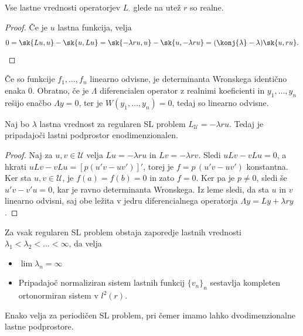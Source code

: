 
\begin{trditev}
  Vse lastne vrednosti operatorjev $L_\cdot$ glede na utež $r$ so realne.
\end{trditev}

\begin{proof}
  Če je $u$ lastna funkcija, velja
  \[
	0 = \sk{Lu, u} - \sk{u, Lu}
	= \sk{- \lambda r u, u} - \sk{u, - \lambda r u}
	= (\konj{\lambda} - \lambda) \sk{u, ru}.
  \]
\end{proof}


\begin{lema}
  Če so funkcije $f_1, \ldots, f_n$ linearno odvisne, je determinanta Wronskega
  identično enaka $0$.
  Obratno, če je $\Lambda$ diferencialen operator z realnimi koeficienti in
  $y_1, \ldots, y_n$ rešijo enačbo $\Lambda y = 0$, ter je $W(y_1, \ldots, y_n)
  = 0$, tedaj so linearno odvisne.
\end{lema}

\begin{trditev}
  Naj bo $\lambda$ lastna vrednost za regularen SL problem $L_{\mathcal{U}} = -
  \lambda r u$.
  Tedaj je pripadajoči lastni podprostor enodimenzionalen.
\end{trditev}

\begin{proof}
  Naj za $u, v \in \mathcal{U}$ velja $Lu = - \lambda r u$ in $Lv = - \lambda r
  v$.
  Sledi $u L v - v L u = 0$, a hkrati $u L v - v L u = [p(u' v - u v')]'$, torej
  je $f = p\,(u'v - uv')$ konstantna.
  Ker sta $u, v \in \mathcal{U}$, je $f(a) = f(b) = 0$ in zato $f = 0$.
  Ker pa je $p \ne 0$, sledi še $u'v - v'u = 0$, kar je ravno determinanta
  Wronskega.
  Iz leme sledi, da sta $u$ in $v$ linearno odvisni, saj obe ležita v jedru
  diferencialnega operatorja $\Lambda y = Ly + \lambda ry$.
\end{proof}


\begin{izrek}
  Za vsak regularen SL problem obstaja zaporedje lastnih vrednosti $\lambda_1 <
  \lambda_2 < \ldots < \infty$, da velja
  \begin{itemize}
  \item $\lim \lambda_n = \infty$
  \item Pripadajoč normaliziran sistem lastnih funkcij $\{v_n\}_n$ sestavlja
	kompleten ortonormiran sistem v $l^2(r)$.
  \end{itemize}
  Enako velja za periodičen SL problem, pri čemer imamo lahko dvodimenzionalne
  lastne podprostore.
\end{izrek}


